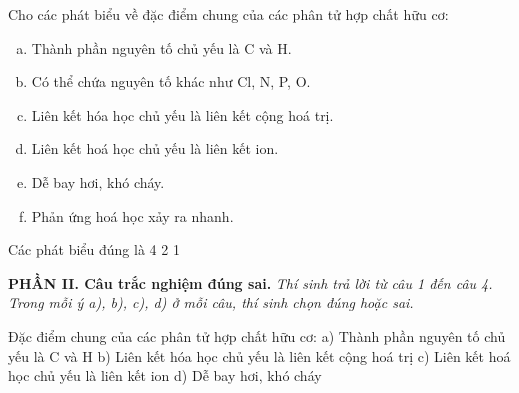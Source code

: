 \documentclass[12pt,a4paper]{article}
\begin{document}
\begin{ex}
Cho các phát biểu về đặc điểm chung của các phân tử hợp chất hữu cơ:
\begin{enumerate}[(a)]
	\item Thành phần nguyên tố chủ yếu là C và H.
	\item Có thể chứa nguyên tố khác như Cl, N, P, O.
	\item Liên kết hóa học chủ yếu là liên kết cộng hoá trị.
	\item Liên kết hoá học chủ yếu là liên kết ion.
	\item Dễ bay hơi, khó cháy.
	\item Phản ứng hoá học xảy ra nhanh.
\end{enumerate}
Các phát biểu đúng là
\choice
{4}
{}
{2}
{1}

\end{ex}

\newpage

\noindent\textbf{\large PHẦN II. Câu trắc nghiệm đúng sai.}
\textit{Thí sinh trả lời từ câu 1 đến câu 4. Trong mỗi ý a), b), c), d) ở mỗi câu, thí sinh chọn đúng hoặc sai.}
\vspace{0.2cm}

\begin{ex}
Đặc điểm chung của các phân tử hợp chất hữu cơ:
\choiceTF
{\True a) Thành phần nguyên tố chủ yếu là C và H}
{\True b) Liên kết hóa học chủ yếu là liên kết cộng hoá trị}
{c) Liên kết hoá học chủ yếu là liên kết ion}
{d) Dễ bay hơi, khó cháy}

\end{ex}
\end{document}
